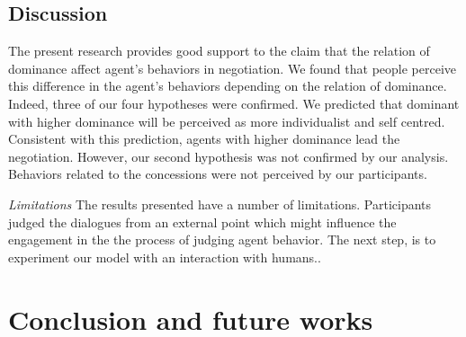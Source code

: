 \documentclass{llncs}
\begin{document}
						
			 \subsection{Discussion}
			 \par  The present research provides good support to the claim that the relation of dominance affect agent's behaviors in negotiation.
			 We found that people perceive this difference in the agent's behaviors depending on the relation of dominance.  Indeed, three of our four hypotheses were confirmed. We predicted that dominant with higher dominance will be perceived as more individualist and self centred. Consistent with this prediction, agents with higher dominance lead the negotiation. However, our second hypothesis was not confirmed by our analysis. Behaviors related to the concessions were not perceived by our participants.  
			 
			 \textit{Limitations} The results presented have a number of limitations. Participants judged the dialogues from an external point which might influence the engagement in the the process of judging agent behavior. The next step, is to experiment our model with an interaction with humans.. 
			 
			 \section{Conclusion and future works}
			\vskip 4pt
			
			
			
\end{document}
